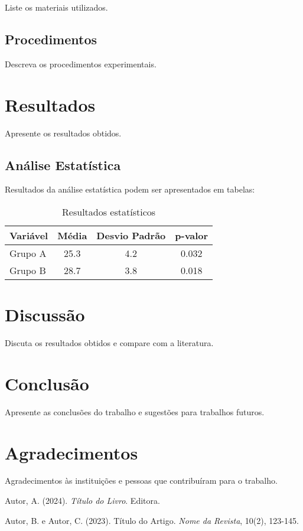 \documentclass[12pt,a4paper]{article}
\begin{document}
Liste os materiais utilizados.

\subsection{Procedimentos}

Descreva os procedimentos experimentais.

\section{Resultados}

Apresente os resultados obtidos.

\subsection{Análise Estatística}

Resultados da análise estatística podem ser apresentados em tabelas:

\begin{table}[h]
  \centering
  \begin{tabular}{|l|c|c|c|}
    \hline
    \textbf{Variável} & \textbf{Média} & \textbf{Desvio Padrão} & \textbf{p-valor} \\
    \hline
    Grupo A & 25.3 & 4.2 & 0.032 \\
    Grupo B & 28.7 & 3.8 & 0.018 \\
    \hline
  \end{tabular}
  \caption{Resultados estatísticos}
  \label{tab:resultados}
\end{table}

\section{Discussão}

Discuta os resultados obtidos e compare com a literatura.

\section{Conclusão}

Apresente as conclusões do trabalho e sugestões para trabalhos futuros.

\section{Agradecimentos}

Agradecimentos às instituições e pessoas que contribuíram para o trabalho.

\begin{thebibliography}{9}

Autor, A. (2024). \textit{Título do Livro}. Editora.

Autor, B. e Autor, C. (2023). Título do Artigo. \textit{Nome da Revista}, 10(2), 123-145.

\end{thebibliography}
\end{document}
